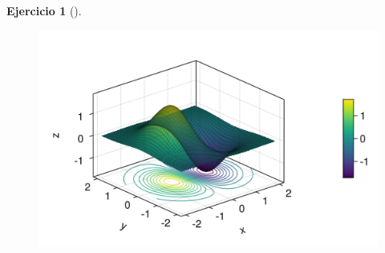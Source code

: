 \documentclass[
  a4paper,
]{scrreport}
\theoremstyle{definition}
\newtheorem{exercise}{Ejercicio}[chapter]
\theoremstyle{remark}
\begin{document}
\begin{exercise}[]
\begin{tcolorbox}
\begin{figure}[H]

{\centering \includegraphics{09-derivadas-funciones-varias-variables_files/figure-pdf/cell-15-output-1.png}

}

\end{figure}

\end{tcolorbox}

\end{exercise}
\end{document}
